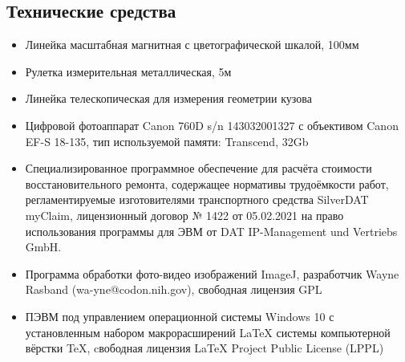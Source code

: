 %
%
\subsection{Технические средства}  %
%
\begin{itemize}
%
\item  Линейка масштабная магнитная с цветографической шкалой, 100мм
\item  Рулетка измерительная металлическая, 5м
\item Линейка телескопическая для измерения геометрии кузова
\item Цифровой фотоаппарат Canon 760D s/n 143032001327 с объективом Canon EF-S 18-135, тип используемой памяти: Transcend,  32Gb
%
\item  Специализированное программное обеспечение для расчёта стоимости  восстановительного ремонта, содержащее нормативы трудоёмкости работ, регламентируемые изготовителями транспортного средства  SilverDAT myClaim,
лицензионный договор № 1422 от 05.02.2021 на право использования программы для ЭВМ от  DAT IP-Management und Vertriebs GmbH.
%
\item  Программа обработки фото-видео изображений ImageJ, разработчик  Wayne Rasband (wa-yne@codon.nih.gov),
свободная лицензия GPL
%
\item  ПЭВМ под управлением операционной системы Windows 10 с установленным набором макрорасширений LaTeX системы компьютерной вёрстки TeX, cвободная лицензия LaTeX Project Public License (LPPL)
%	
	\end{itemize}
